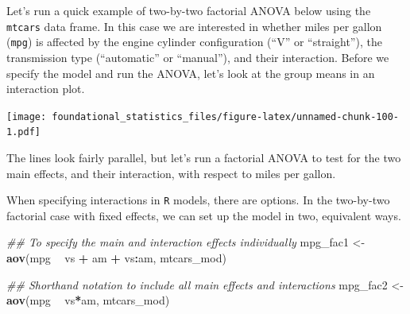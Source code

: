 \documentclass[]{book}
\newenvironment{Shaded}{\begin{snugshade}}{\end{snugshade}}
\newcommand{\CommentTok}[1]{\textcolor[rgb]{0.56,0.35,0.01}{\textit{#1}}}
\newcommand{\DataTypeTok}[1]{\textcolor[rgb]{0.13,0.29,0.53}{#1}}
\newcommand{\DecValTok}[1]{\textcolor[rgb]{0.00,0.00,0.81}{#1}}
\newcommand{\KeywordTok}[1]{\textcolor[rgb]{0.13,0.29,0.53}{\textbf{#1}}}
\newcommand{\NormalTok}[1]{#1}
\newcommand{\OperatorTok}[1]{\textcolor[rgb]{0.81,0.36,0.00}{\textbf{#1}}}
\newcommand{\StringTok}[1]{\textcolor[rgb]{0.31,0.60,0.02}{#1}}
\begin{document}
Let's run a quick example of two-by-two factorial ANOVA below using the \texttt{mtcars} data frame. In this case we are interested in whether miles per gallon (\texttt{mpg}) is affected by the engine cylinder configuration (``V'' or ``straight''), the transmission type (``automatic'' or ``manual''), and their interaction. Before we specify the model and run the ANOVA, let's look at the group means in an interaction plot.

\begin{Shaded}
\end{Shaded}

\texttt{[image: foundational\_statistics\_files/figure-latex/unnamed-chunk-100-1.pdf]}

The lines look fairly parallel, but let's run a factorial ANOVA to test for the two main effects, and their interaction, with respect to miles per gallon.

When specifying interactions in \texttt{R} models, there are options. In the two-by-two factorial case with fixed effects, we can set up the model in two, equivalent ways.

\begin{Shaded}
\begin{Highlighting}[]
\CommentTok{## To specify the main and interaction effects individually}
\NormalTok{mpg_fac1 <-}\StringTok{ }\KeywordTok{aov}\NormalTok{(mpg }\OperatorTok{~}\StringTok{ }\NormalTok{vs }\OperatorTok{+}\StringTok{ }\NormalTok{am }\OperatorTok{+}\StringTok{ }\NormalTok{vs}\OperatorTok{:}\NormalTok{am, mtcars_mod)}

\CommentTok{## Shorthand notation to include all main effects and interactions}
\NormalTok{mpg_fac2 <-}\StringTok{ }\KeywordTok{aov}\NormalTok{(mpg }\OperatorTok{~}\StringTok{ }\NormalTok{vs}\OperatorTok{*}\NormalTok{am, mtcars_mod)}
\end{Highlighting}
\end{Shaded}
\end{document}
